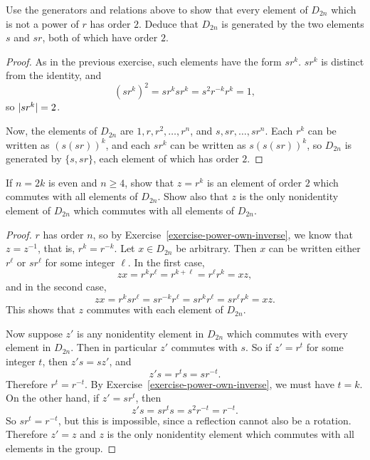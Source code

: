  Use the generators and relations above to show that every
element of $D_{2n}$ which is not a power of $r$ has order $2$. Deduce
that $D_{2n}$ is generated by the two elements $s$ and $sr$, both of
which have order $2$.
\begin{proof}
  As in the previous exercise, such elements have the form
  $sr^k$. $sr^k$ is distinct from the identity, and
  \begin{equation*}
    (sr^k)^2 = sr^ksr^k = s^2r^{-k}r^k = 1,
  \end{equation*}
  so $\lvert{sr^k}\rvert = 2$.

  Now, the elements of $D_{2n}$ are $1, r, r^2, \dots, r^n$, and
  $s, sr, \dots, sr^n$. Each $r^k$ can be written as $(s(sr))^k$, and
  each $sr^k$ can be written as $s(s(sr))^k$, so $D_{2n}$ is generated
  by $\{ s, sr \}$, each element of which has order $2$.
\end{proof}

 If $n = 2k$ is even and $n\geq4$, show that $z = r^k$ is an
element of order $2$ which commutes with all elements of
$D_{2n}$. Show also that $z$ is the only nonidentity element of
$D_{2n}$ which commutes with all elements of $D_{2n}$.
\begin{proof}
  $r$ has order $n$, so by Exercise~\ref{exercise-power-own-inverse},
  we know that $z = z^{-1}$, that is, $r^k = r^{-k}$. Let
  $x\in D_{2n}$ be arbitrary. Then $x$ can be written either $r^\ell$
  or $sr^\ell$ for some integer $\ell$. In the first case,
  \begin{equation*}
    zx = r^kr^\ell = r^{k+\ell} = r^\ell r^k = xz,
  \end{equation*}
  and in the second case,
  \begin{equation*}
    zx = r^ksr^\ell = sr^{-k}r^\ell = sr^kr^\ell = sr^\ell r^k = xz.
  \end{equation*}
  This shows that $z$ commutes with each element of $D_{2n}$.

  Now suppose $z'$ is any nonidentity element in $D_{2n}$ which
  commutes with every element in $D_{2n}$. Then in particular $z'$
  commutes with $s$. So if $z' = r^t$ for some integer $t$, then
  $z's = sz'$, and
  \begin{equation*}
    z's = r^ts = sr^{-t}.
  \end{equation*}
  Therefore $r^t = r^{-t}$. By
  Exercise~\ref{exercise-power-own-inverse}, we must have $t = k$. On
  the other hand, if $z' = sr^t$, then
  \begin{equation*}
    z's = sr^ts = s^2r^{-t} = r^{-t}.
  \end{equation*}
  So $sr^t = r^{-t}$, but this is impossible, since a reflection
  cannot also be a rotation. Therefore $z' = z$ and $z$ is the only
  nonidentity element which commutes with all elements in the group.
\end{proof}
